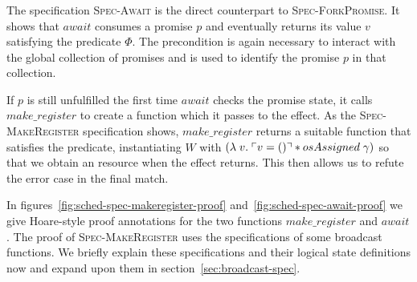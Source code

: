 \subsubsection{}
\label{sec:sched-spec-await}

The specification \textsc{Spec-Await} is the direct counterpart to \textsc{Spec-ForkPromise}.
It shows that \(await\) consumes a promise \(p\) and eventually returns its value \(v\) satisfying the predicate \(\Phi\).
The precondition \gsPInv{} is again necessary to interact with the global collection of promises and \gsIsPr{} is used to identify the promise \(p\) in that collection.

If \(p\) is still unfulfilled the first time \(await\) checks the promise state, it calls \(make\_register\) to create a  function which it passes to the \esuspend{} effect.
As the \textsc{Spec-MakeRegister} specification shows, \(make\_register\) returns a suitable function that satisfies the  predicate, instantiating \(W\) with \((\lambda\; v.\; \ulcorner v = () \urcorner \ast osAssigned\;\gamma)\) so that we obtain an \gspdone{\gamma} resource when the effect returns.
This then allows us to refute the error case in the final match.


In figures~\ref{fig:sched-spec-makeregister-proof} and~\ref{fig:sched-spec-await-proof} we give Hoare-style proof annotations for the two functions \(make\_register\) and \(await\).
The proof of \textsc{Spec-MakeRegister} uses the specifications of some broadcast functions.
We briefly explain these specifications and their logical state definitions now and expand upon them in section~\ref{sec:broadcast-spec}.


